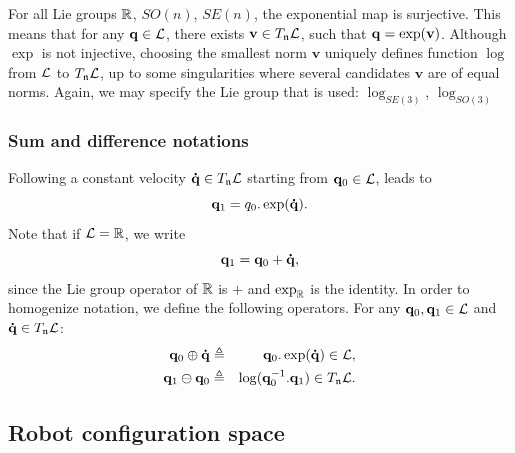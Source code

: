 For all Lie groups $\mathbb{R}$, $SO(n)$, $SE(n)$, the exponential map is surjective. This means that for any $\mathbf{q}\in\mathcal{L}$, there exists $\mathbf{v}\in T_{\mathfrak{n}}\mathcal{L}$, such that $\mathbf{q} = \exp(\mathbf{v})$.
Although $\exp$ is not injective, choosing the smallest norm $\mathbf{v}$ uniquely defines function $\log$ from $\mathcal{L}$ to $T_{\mathfrak{n}}\mathcal{L}$, up to some singularities where several candidates $\mathbf{v}$ are of equal norms.
Again, we may specify the Lie group that is used: \href{https://github.com/stack-of-tasks/pinocchio/blob/f8f3b9a24eab527df79650e3dc73410f9a46a2b2/src/spatial/log.hxx\#L112}{$\log_{SE(3)}$}, \href{https://github.com/stack-of-tasks/pinocchio/blob/f8f3b9a24eab527df79650e3dc73410f9a46a2b2/src/spatial/log.hxx\#L15}{$\log_{SO(3)}$}

\subsubsection{Sum and difference notations}

Following a constant velocity $\mathbf{\dot{q}}\in T_{\mathfrak{n}}\mathcal{L}$ starting from $\mathbf{q}_0\in\mathcal{L}$, leads to
$$
\mathbf{q}_1 = q_0.\exp(\mathbf{\dot{q}}).
$$
Note that if $\mathcal{L}=\mathbb{R}$, we write
$$
\mathbf{q}_1 = \mathbf{q}_0 + \mathbf{\dot{q}},
$$
since the Lie group operator of $\mathbb{R}$ is $+$ and $\exp_{\mathbb{R}}$ is the identity.
In order to homogenize notation, we define the following operators. For any
$\mathbf{q}_0,\mathbf{q}_1\in\mathcal{L}$ and $\mathbf{\dot{q}}\in T_{\mathfrak{n}}\mathcal{L}$:
\begin{eqnarray}\label{eq:plus}
  \conf_0 \oplus \dconf &\triangleq& \conf_0.\exp(\dconf) \in \liegroup,\\
  \label{eq:minus}
  \conf_1 \ominus \conf_0 &\triangleq& \log(\conf_0^{-1}.\conf_1) \in T_{\neutral}\liegroup.
\end{eqnarray}

\subsection{Robot configuration space}

